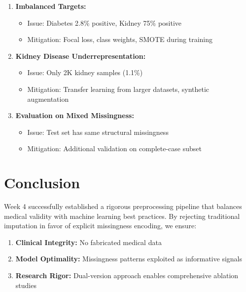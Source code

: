 \documentclass[12pt,a4paper]{article}
\begin{document}
\begin{enumerate}
    \item \textbf{Imbalanced Targets:}
    \begin{itemize}
        \item Issue: Diabetes 2.8\% positive, Kidney 75\% positive
        \item Mitigation: Focal loss, class weights, SMOTE during training
    \end{itemize}
    
    \item \textbf{Kidney Disease Underrepresentation:}
    \begin{itemize}
        \item Issue: Only 2K kidney samples (1.1\%)
        \item Mitigation: Transfer learning from larger datasets, synthetic augmentation
    \end{itemize}
    
    \item \textbf{Evaluation on Mixed Missingness:}
    \begin{itemize}
        \item Issue: Test set has same structural missingness
        \item Mitigation: Additional validation on complete-case subset
    \end{itemize}
\end{enumerate}

\section{Conclusion}

Week 4 successfully established a rigorous preprocessing pipeline that balances medical validity with machine learning best practices. By rejecting traditional imputation in favor of explicit missingness encoding, we ensure:

\begin{enumerate}
    \item \textbf{Clinical Integrity:} No fabricated medical data
    \item \textbf{Model Optimality:} Missingness patterns exploited as informative signals
    \item \textbf{Research Rigor:} Dual-version approach enables comprehensive ablation studies
\end{enumerate}
\end{document}
